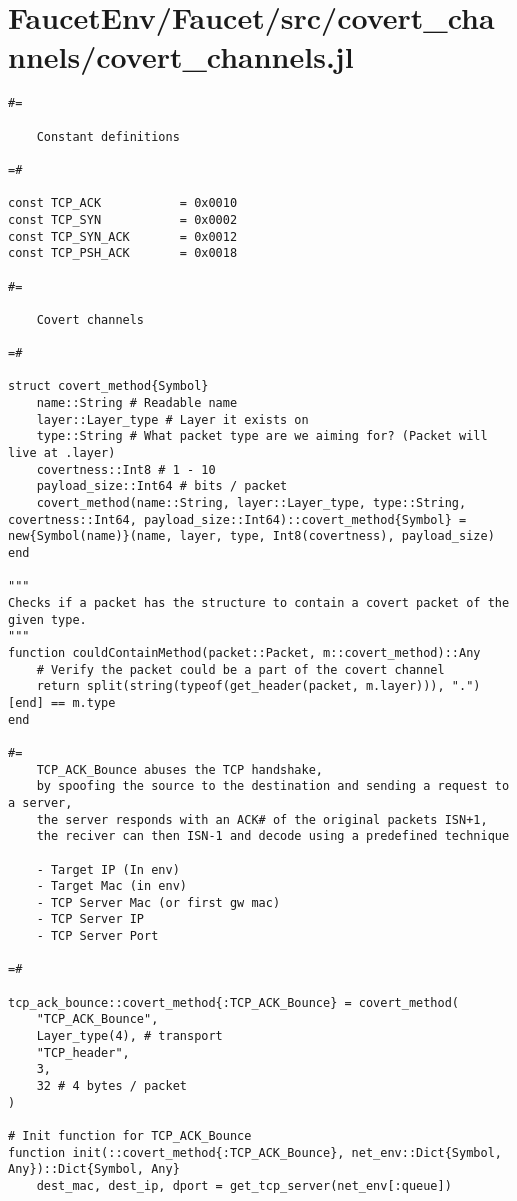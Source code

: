 \section{FaucetEnv/Faucet/src/covert\_channels/covert\_channels.jl}
\begin{lstlisting}[language=JuliaLocal, style=julia]
#=

    Constant definitions

=#

const TCP_ACK           = 0x0010
const TCP_SYN           = 0x0002
const TCP_SYN_ACK       = 0x0012
const TCP_PSH_ACK       = 0x0018

#=

    Covert channels

=#

struct covert_method{Symbol}
    name::String # Readable name
    layer::Layer_type # Layer it exists on
    type::String # What packet type are we aiming for? (Packet will live at .layer)
    covertness::Int8 # 1 - 10
    payload_size::Int64 # bits / packet
    covert_method(name::String, layer::Layer_type, type::String, covertness::Int64, payload_size::Int64)::covert_method{Symbol} = new{Symbol(name)}(name, layer, type, Int8(covertness), payload_size)
end

"""
Checks if a packet has the structure to contain a covert packet of the given type.
"""
function couldContainMethod(packet::Packet, m::covert_method)::Any
    # Verify the packet could be a part of the covert channel
    return split(string(typeof(get_header(packet, m.layer))), ".")[end] == m.type
end

#=
    TCP_ACK_Bounce abuses the TCP handshake,
    by spoofing the source to the destination and sending a request to a server,
    the server responds with an ACK# of the original packets ISN+1,
    the reciver can then ISN-1 and decode using a predefined technique

    - Target IP (In env)
    - Target Mac (in env)
    - TCP Server Mac (or first gw mac)
    - TCP Server IP
    - TCP Server Port

=#

tcp_ack_bounce::covert_method{:TCP_ACK_Bounce} = covert_method(
    "TCP_ACK_Bounce",
    Layer_type(4), # transport
    "TCP_header",
    3,
    32 # 4 bytes / packet
)

# Init function for TCP_ACK_Bounce
function init(::covert_method{:TCP_ACK_Bounce}, net_env::Dict{Symbol, Any})::Dict{Symbol, Any}
    dest_mac, dest_ip, dport = get_tcp_server(net_env[:queue])


\end{lstlisting}
